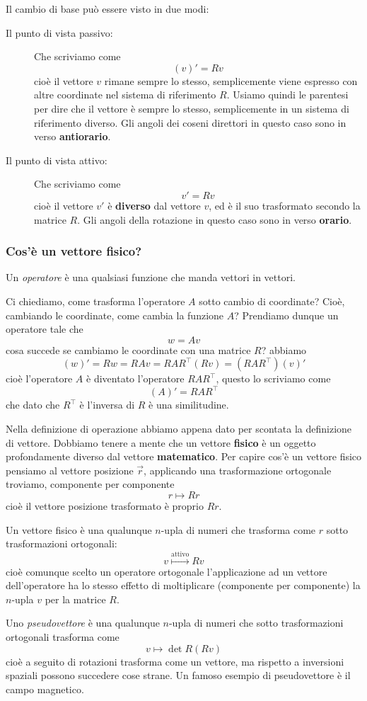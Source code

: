 \documentclass[11pt]{scrartcl}
\begin{document}
	Il cambio di base può essere visto in due modi:
	\begin{description}
		\item[Il punto di vista passivo:] Che scriviamo come
		$$(v)'=Rv$$
		cioè il vettore $v$ rimane sempre lo stesso, semplicemente viene espresso con altre coordinate nel sistema di riferimento $R$. Usiamo quindi le parentesi per dire che il vettore è sempre lo stesso, semplicemente in un sistema di riferimento diverso. Gli angoli dei coseni direttori in questo caso sono in verso \textbf{antiorario}.
		\item[Il punto di vista attivo:] Che scriviamo come
		$$v'=Rv$$
		cioè il vettore $v'$ è \textbf{diverso} dal vettore $v$, ed è il suo trasformato secondo la matrice $R$. Gli angoli della rotazione in questo caso sono in verso \textbf{orario}.
	\end{description}
	\subsubsection{Cos'è un vettore fisico?}
	\begin{definition}[Operatore]
		Un \textit{operatore} è una qualsiasi funzione che manda vettori in vettori. 
	\end{definition}
	Ci chiediamo, come trasforma l'operatore $A$ sotto cambio di coordinate? Cioè, cambiando le coordinate, come cambia la funzione $A$? Prendiamo dunque un operatore tale che
	$$w=Av$$
	cosa succede se cambiamo le coordinate con una matrice $R$? abbiamo
	$$(w)'=Rw=RAv=RAR^\intercal (Rv)=(RAR^\intercal)(v)'$$
	cioè l'operatore $A$ è diventato l'operatore $RAR^\intercal$, questo lo scriviamo come
	$$(A)'=RAR^\intercal$$
	che dato che $R^\intercal$ è l'inversa di $R$ è una similitudine.

	Nella definizione di operazione abbiamo appena dato per scontata la definizione di vettore. Dobbiamo tenere a mente che un vettore \textbf{fisico} è un oggetto profondamente diverso dal vettore \textbf{matematico}. Per capire cos'è un vettore fisico pensiamo al vettore posizione $\vec{r}$, applicando una trasformazione ortogonale troviamo, componente per componente
	$$r\mapsto Rr$$
	cioè il vettore posizione trasformato è proprio $Rr$.
	\begin{definition}
		Un vettore fisico è una qualunque $n$-upla di numeri che trasforma come $r$ sotto trasformazioni ortogonali:
		$$v\overset{\text{attivo}}{\longmapsto} Rv$$
		cioè comunque scelto un operatore ortogonale l'applicazione ad un vettore dell'operatore ha lo stesso effetto di moltiplicare (componente per componente) la $n$-upla $v$ per la matrice $R$.
	\end{definition}
	\begin{definition}[Pseudovettore]
		Uno \textit{pseudovettore} è una qualunque $n$-upla di numeri che sotto trasformazioni ortogonali trasforma come
		$$v\mapsto \det R (Rv)$$
		cioè a seguito di rotazioni trasforma come un vettore, ma rispetto a inversioni spaziali possono succedere cose strane. Un famoso esempio di pseudovettore è il campo magnetico.
	\end{definition}
	
\end{document}
